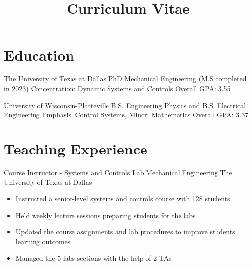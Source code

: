 \documentclass[11pt,letterpaper,roman]{moderncv} %
\title{Curriculum Vitae}
\begin{document}

\makecvtitle %

\vspace{- 1 cm}

\section{Education}

{The University of Texas at Dallas}
{PhD Mechanical Engineering (M.S completed in 2023)}{}
{Concentration: Dynamic Systems and Controls} 
{Overall GPA: 3.55}

{University of Wisconsin-Platteville}
{B.S. Engineering Physics and  B.S. Electrical Engineering}{}
{Emphasis: Control Systems, Minor: Mathematics} 
{Overall GPA: 3.37}




\section{Teaching Experience}
{Course Instructor - Systems and Controls Lab}
{Mechanical Engineering}
{The University of Texas at Dallas}{}
{\begin{itemize}
    \item Instructed a senior-level systems and controls course with 128 students
    \item Held weekly lecture sessions preparing students for the labs
    \item Updated the course assignments and lab procedures to improve students learning outcomes
    \item Managed the 5 labs sections with the help of 2 TAs
\end{itemize}}
\end{document}
